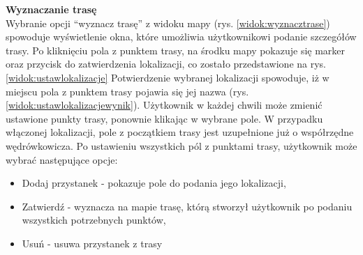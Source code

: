 \textbf{Wyznaczanie trasę} \\
\indent Wybranie opcji “wyznacz trasę” z widoku mapy (rys. \ref{widok:wyznacztrase}) spowoduje wyświetlenie okna, które umożliwia użytkownikowi podanie szczegółów trasy. Po kliknięciu pola z punktem trasy, na środku mapy pokazuje się marker oraz przycisk do zatwierdzenia lokalizacji, co zostało przedstawione na rys.\ref{widok:ustawlokalizacje} Potwierdzenie wybranej lokalizacji spowoduje, iż w miejscu pola z punktem trasy pojawia się jej nazwa (rys. \ref{widok:ustawlokalizacjewynik}). Użytkownik w każdej chwili może zmienić ustawione punkty trasy, ponownie klikając w wybrane pole. W przypadku włączonej lokalizacji, pole z początkiem trasy jest uzupełnione już o współrzędne wędrówkowicza. Po ustawieniu wszystkich pól z punktami trasy, użytkownik może wybrać następujące opcje:
\begin{itemize}
    \item Dodaj przystanek - pokazuje pole do podania jego lokalizacji,
    \item Zatwierdź - wyznacza na mapie trasę, którą stworzył użytkownik po podaniu wszystkich potrzebnych punktów,
    \item Usuń - usuwa przystanek z trasy
\end{itemize}

